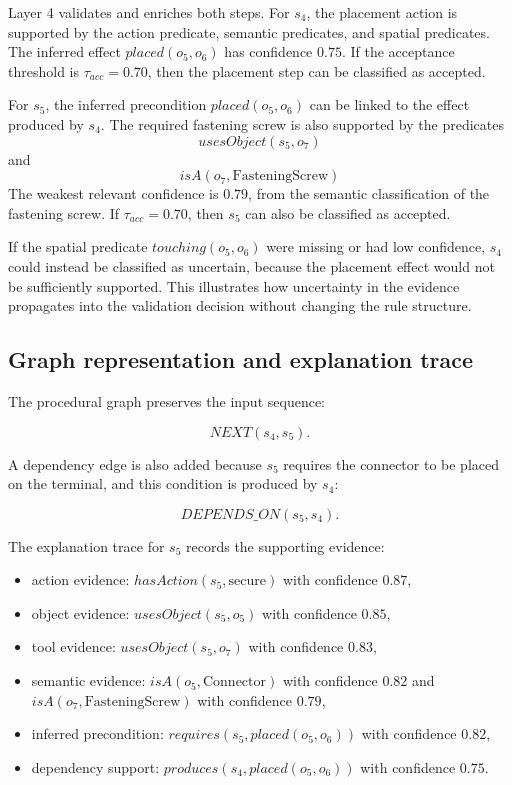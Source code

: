 Layer 4 validates and enriches both steps. For $s_4$, the placement action is supported by the action predicate, semantic predicates, and spatial predicates. The inferred effect $placed(o_5,o_6)$ has confidence $0.75$. If the acceptance threshold is $\tau_{acc}=0.70$, then the placement step can be classified as accepted.

For $s_5$, the inferred precondition $placed(o_5,o_6)$ can be linked to the effect produced by $s_4$. The required fastening screw is also supported by the predicates
\[
usesObject(s_5,o_7)
\]
and
\[isA(o_7,\text{FasteningScrew})
\]
The weakest relevant confidence is $0.79$, from the semantic classification of the fastening screw. If $\tau_{acc}=0.70$, then $s_5$ can also be classified as accepted.

If the spatial predicate $touching(o_5,o_6)$ were missing or had low confidence, $s_4$ could instead be classified as uncertain, because the placement effect would not be sufficiently supported. This illustrates how uncertainty in the evidence propagates into the validation decision without changing the rule structure.

\subsection{Graph representation and explanation trace}

The procedural graph preserves the input sequence:

\[
NEXT(s_4,s_5).
\]

A dependency edge is also added because $s_5$ requires the connector to be placed on the terminal, and this condition is produced by $s_4$:

\[
DEPENDS\_ON(s_5,s_4).
\]

The explanation trace for $s_5$ records the supporting evidence:

\begin{itemize}
    \item action evidence: $hasAction(s_5,\text{secure})$ with confidence $0.87$,
    \item object evidence: $usesObject(s_5,o_5)$ with confidence $0.85$,
    \item tool evidence: $usesObject(s_5,o_7)$ with confidence $0.83$,
    \item semantic evidence: $isA(o_5,\text{Connector})$ with confidence $0.82$ and $isA(o_7,\text{FasteningScrew})$ with confidence $0.79$,
    \item inferred precondition: $requires(s_5, placed(o_5,o_6))$ with confidence $0.82$,
    \item dependency support: $produces(s_4, placed(o_5,o_6))$ with confidence $0.75$.
\end{itemize}

